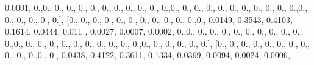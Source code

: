 \documentclass[
]{book}
\newenvironment{Shaded}{\begin{snugshade}}{\end{snugshade}}
\newcommand{\FloatTok}[1]{\textcolor[rgb]{0.00,0.00,0.81}{#1}}
\newcommand{\NormalTok}[1]{#1}
\begin{document}
\begin{Shaded}
\begin{Highlighting}[]
\FloatTok{0.0001}\NormalTok{, }\FloatTok{0.}\NormalTok{,}\FloatTok{0.}\NormalTok{, }\FloatTok{0.}\NormalTok{, }\FloatTok{0.}\NormalTok{, }\FloatTok{0.}\NormalTok{, }\FloatTok{0.}\NormalTok{, }\FloatTok{0.}\NormalTok{, }\FloatTok{0.}\NormalTok{, }\FloatTok{0.}\NormalTok{, }\FloatTok{0.}\NormalTok{, }\FloatTok{0.}\NormalTok{, }\FloatTok{0.}\NormalTok{,}\FloatTok{0.}\NormalTok{, }\FloatTok{0.}\NormalTok{, }\FloatTok{0.}\NormalTok{, }\FloatTok{0.}\NormalTok{, }\FloatTok{0.}\NormalTok{, }\FloatTok{0.}\NormalTok{,}
\FloatTok{0.}\NormalTok{, }\FloatTok{0.}\NormalTok{, }\FloatTok{0.}\NormalTok{, }\FloatTok{0.}\NormalTok{, }\FloatTok{0.}\NormalTok{,}\FloatTok{0.}\NormalTok{, }\FloatTok{0.}\NormalTok{, }\FloatTok{0.}\NormalTok{, }\FloatTok{0.}\NormalTok{, }\FloatTok{0.}\NormalTok{, }\FloatTok{0.}\NormalTok{], [}\FloatTok{0.}\NormalTok{, }\FloatTok{0.}\NormalTok{, }\FloatTok{0.}\NormalTok{, }\FloatTok{0.}\NormalTok{, }\FloatTok{0.}\NormalTok{, }\FloatTok{0.}\NormalTok{, }\FloatTok{0.}\NormalTok{, }\FloatTok{0.}\NormalTok{, }\FloatTok{0.}\NormalTok{,}
\FloatTok{0.}\NormalTok{, }\FloatTok{0.}\NormalTok{,}\FloatTok{0.}\NormalTok{, }\FloatTok{0.0149}\NormalTok{, }\FloatTok{0.3543}\NormalTok{, }\FloatTok{0.4103}\NormalTok{, }\FloatTok{0.1614}\NormalTok{, }\FloatTok{0.0444}\NormalTok{, }\FloatTok{0.011}\NormalTok{ , }\FloatTok{0.0027}\NormalTok{, }\FloatTok{0.0007}\NormalTok{,}
\FloatTok{0.0002}\NormalTok{, }\FloatTok{0.}\NormalTok{,}\FloatTok{0.}\NormalTok{, }\FloatTok{0.}\NormalTok{, }\FloatTok{0.}\NormalTok{, }\FloatTok{0.}\NormalTok{, }\FloatTok{0.}\NormalTok{, }\FloatTok{0.}\NormalTok{, }\FloatTok{0.}\NormalTok{, }\FloatTok{0.}\NormalTok{, }\FloatTok{0.}\NormalTok{, }\FloatTok{0.}\NormalTok{, }\FloatTok{0.}\NormalTok{,}\FloatTok{0.}\NormalTok{, }\FloatTok{0.}\NormalTok{, }\FloatTok{0.}\NormalTok{, }\FloatTok{0.}\NormalTok{, }\FloatTok{0.}\NormalTok{, }\FloatTok{0.}\NormalTok{,}
\FloatTok{0.}\NormalTok{, }\FloatTok{0.}\NormalTok{, }\FloatTok{0.}\NormalTok{, }\FloatTok{0.}\NormalTok{, }\FloatTok{0.}\NormalTok{,}\FloatTok{0.}\NormalTok{, }\FloatTok{0.}\NormalTok{, }\FloatTok{0.}\NormalTok{, }\FloatTok{0.}\NormalTok{, }\FloatTok{0.}\NormalTok{, }\FloatTok{0.}\NormalTok{], [}\FloatTok{0.}\NormalTok{, }\FloatTok{0.}\NormalTok{, }\FloatTok{0.}\NormalTok{, }\FloatTok{0.}\NormalTok{, }\FloatTok{0.}\NormalTok{, }\FloatTok{0.}\NormalTok{, }\FloatTok{0.}\NormalTok{, }\FloatTok{0.}\NormalTok{, }\FloatTok{0.}\NormalTok{,}
\FloatTok{0.}\NormalTok{, }\FloatTok{0.}\NormalTok{,}\FloatTok{0.}\NormalTok{, }\FloatTok{0.}\NormalTok{, }\FloatTok{0.0438}\NormalTok{, }\FloatTok{0.4122}\NormalTok{, }\FloatTok{0.3611}\NormalTok{, }\FloatTok{0.1334}\NormalTok{, }\FloatTok{0.0369}\NormalTok{, }\FloatTok{0.0094}\NormalTok{, }\FloatTok{0.0024}\NormalTok{, }\FloatTok{0.0006}\NormalTok{,}

\end{Highlighting}
\end{Shaded}
\end{document}
